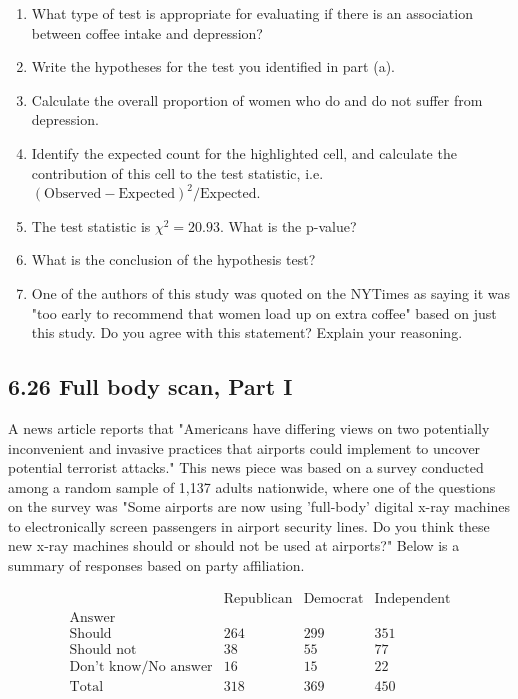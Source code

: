 \documentclass{article}
\begin{document}
\begin{enumerate}
    \item What type of test is appropriate for evaluating if there is an association between coffee intake and depression?
    \item Write the hypotheses for the test you identified in part (a).
    \item Calculate the overall proportion of women who do and do not suffer from depression.
    \item Identify the expected count for the highlighted cell, and calculate the contribution of this cell to the test statistic, i.e. \((\text{Observed} - \text{Expected})^2/\text{Expected}\).
    \item The test statistic is \(\chi^2 = 20.93\). What is the p-value?
    \item What is the conclusion of the hypothesis test?
    \item One of the authors of this study was quoted on the NYTimes as saying it was "too early to recommend that women load up on extra coffee" based on just this study. Do you agree with this statement? Explain your reasoning.
\end{enumerate}

\subsection*{6.26 Full body scan, Part I}
A news article reports that "Americans have differing views on two potentially inconvenient and invasive practices that airports could implement to uncover potential terrorist attacks." This news piece was based on a survey conducted among a random sample of 1,137 adults nationwide, where one of the questions on the survey was "Some airports are now using 'full-body' digital x-ray machines to electronically screen passengers in airport security lines. Do you think these new x-ray machines should or should not be used at airports?" Below is a summary of responses based on party affiliation.

\[
\begin{array}{cccc}
 & \text{Republican} & \text{Democrat} & \text{Independent} \\
\text{Answer} & & & \\
\text{Should} & 264 & 299 & 351 \\
\text{Should not} & 38 & 55 & 77 \\
\text{Don't know/No answer} & 16 & 15 & 22 \\
\text{Total} & 318 & 369 & 450 \\
\end{array}
\]
\end{document}
